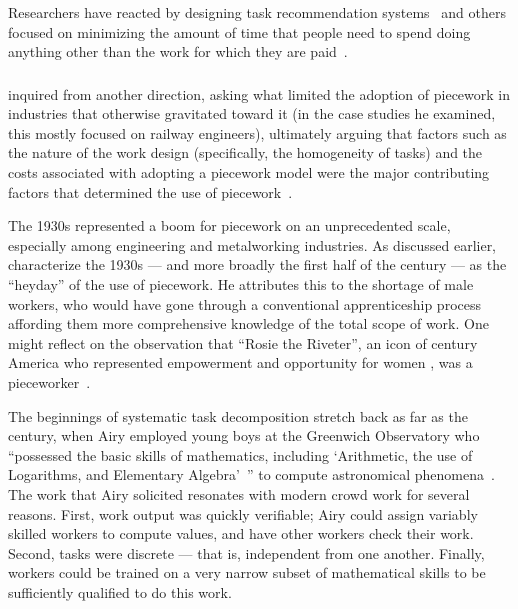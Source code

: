 \documentclass[trackingWork]{subfiles}
\begin{document}
Researchers have reacted by designing task recommendation systems~\cite[e.g.][]{Cosley:2007:SUI:1216295.1216309}
and others focused on
minimizing the amount of time that people need to spend doing anything other than
the work for which they are paid~\cite{callison2014crowd}.



\subsubsection{\pieceworkpers}
\citeauthor{Brown01041990} inquired from another direction,
asking
what limited the adoption of piecework in industries that otherwise gravitated toward it
(in the case studies he examined,
this mostly focused on railway engineers),
ultimately arguing that factors such as the nature of the work design
(specifically,
the homogeneity of tasks) and the costs associated with adopting a piecework model
were the major contributing factors that determined the use of piecework~\cite{Brown01041990}.

The 1930s represented a boom for piecework on an unprecedented scale,
especially among engineering and metalworking industries.
As discussed earlier, \citeauthor{hart2013rise} characterize the 1930s
--- and more broadly the first half of the  century ---
as the ``heyday'' of the use of piecework.
He attributes this to the shortage of male workers,
who would have gone through a conventional apprenticeship process
affording them more comprehensive knowledge of the total scope of work.
One might reflect on the observation that ``Rosie the Riveter'',
an icon of  century America who
represented empowerment and opportunity for women \cite{honey1985creating},
was a pieceworker~\cite{davies2014origins}.



The beginnings of
systematic task decomposition
stretch back as far as the  century,
when Airy employed young boys at the Greenwich Observatory who
``possessed the basic skills of mathematics,
including
`Arithmetic,
the use of Logarithms,
and Elementary Algebra'~''
to compute astronomical phenomena~\cite{grier2013computers}.
The work that Airy solicited resonates with modern crowd work for several reasons.
First,
work output was quickly verifiable;
Airy could assign variably skilled workers to compute values,
and have other workers check their work.
Second,
tasks were discrete
--- that is,
independent from one another.
Finally,
workers could be trained on a very narrow subset of mathematical skills to be
sufficiently qualified to do this work.
\end{document}
